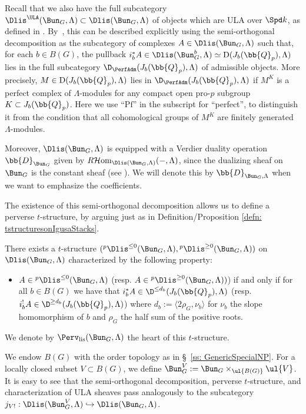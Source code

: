 \documentclass[letterpaper,11pt]{amsart}
\begin{document}
Recall that we also have the full subcategory $\Dlis^{\ULA}(\Bun_{G},\Lambda) \subset \Dlis(\Bun_{G},\Lambda)$ of objects which are ULA over $\Spd k$, as defined in \cite[Definition~VII~7.8]{FSGeomLLC}. By~\cite[Proposition~VII.7.9]{FSGeomLLC}, this can be described explicitly using the semi-orthogonal decomposition as the subcategory of complexes $A \in \Dlis(\Bun_{G},\Lambda)$ such that, for each $b\in B(G)$, the pullback $i_{b}^{*}A \in \Dlis(\Bun_{G}^{b},\Lambda) \simeq \mathrm{D}(J_{b}(\bb{Q}_{p}),\Lambda)$ lies in the full subcategory $\D_{\PerfAdm}(J_{b}(\bb{Q}_{p}),\Lambda)$ of admissible objects. More precisely, $M \in \mathrm{D}(J_{b}(\bb{Q}_{p}),\Lambda)$ lies in $\D_{\PerfAdm}(J_{b}(\bb{Q}_{p}),\Lambda)$ if $M^K$ is a perfect complex of $\Lambda$-modules for any compact open pro-$p$ subgroup $K\subset J_b(\bb{Q}_p)$. Here we use ``$\mathrm{Pf}$'' in the subscript for ``perfect'', to distinguish it from the condition that all cohomological groups of $M^K$ are finitely generated $\Lambda$-modules.

Moreover, $\Dlis(\Bun_{G},\Lambda)$ is equipped with a Verdier duality operation $\bb{D}_{\Bun_{G}}$ given by $R\mathcal{H}\mathrm{om}_{\Dlis(\Bun_{G},\Lambda)}(-,\Lambda)$, since the dualizing sheaf on $\Bun_{G}$ is the constant sheaf (see \cite[Proposition~3.1]{HamannImai}). We will denote this by $\bb{D}_{\Bun_{G},\Lambda}$ when we want to emphasize the coefficients.

The existence of this semi-orthogonal decomposition allows us to define a perverse $t$-structure, by arguing just as in Definition/Proposition \ref{defn: tstructuresonIgusaStacks}.  
\begin{definition/proposition}{\label{defn: existenceofperversetstructure}}
There exists a $t$-structure $(\phantom{}^{p}\Dlis^{\leq 0}(\Bun_{G},\Lambda),\phantom{}^{p}\Dlis^{\geq 0}(\Bun_{G},\Lambda))$ on $\Dlis(\Bun_G,\Lambda)$ characterized by the following property:
\begin{itemize}
\item $A \in \phantom{}^{p}\Dlis^{\leq 0}(\Bun_{G},\Lambda)$ (resp. $A\in \phantom{}^{p}\Dlis^{\geq 0}(\Bun_{G},\Lambda))$) if and only if for all $b \in B(G)$ we have that $i_{b}^{*}A \in \D^{\leq d_{b}}(J_{b}(\bb{Q}_{p}),\Lambda)$ (resp. $i_{b}^{!}A \in \D^{\geq d_{b}}(J_{b}(\bb{Q}_{p}),\Lambda)$) where $d_{b} := \langle 2\rho_{G},\nu_{b} \rangle$ for $\nu_{b}$ the slope homomorphism of $b$ and $\rho_{G}$ the half sum of the positive roots.
\end{itemize}
We denote by $\Perv_{\mathrm{lis}}(\Bun_{G},\Lambda)$ the heart of this $t$-structure. 
\end{definition/proposition}
We endow $B(G)$ with the order topology as in \S~\ref{ss: GenericSpecialNP}. For a locally closed subset $V \subset B(G)$, we define $\Bun_{G}^V:= \Bun_{G}\times_{\ul{B(G)}}\ul{V}$. It is easy to see that the semi-orthogonal decomposition, perverse $t$-structure, and characterization of ULA sheaves pass analogously to the subcategory $j_{V!}: \Dlis(\Bun_{G}^{V},\Lambda) \hookrightarrow \Dlis(\Bun_{G},\Lambda)$. 
\end{document}
